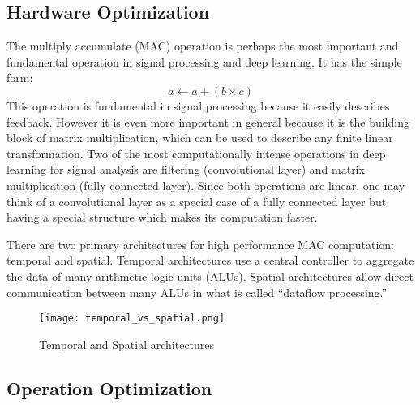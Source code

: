\subsection{Hardware Optimization}
The multiply accumulate (MAC) operation is perhaps the most important and fundamental operation in signal processing and deep learning.  It has the simple form:
$$ a \leftarrow a + (b\times c) $$
This operation is fundamental in signal processing because it easily describes feedback.  However it is even more important in general because it is the building block of matrix multiplication, which can be used to describe any finite linear transformation.  Two of the most computationally intense operations in deep learning for signal analysis are filtering (convolutional layer) and matrix multiplication (fully connected layer).  Since both operations are linear, one may think of a convolutional layer as a special case of a fully connected layer but having a special structure which makes its computation faster.

There are two primary architectures for high performance MAC computation: temporal and spatial. Temporal architectures use a central controller to aggregate the data of many arithmetic logic units (ALUs).  Spatial architectures allow direct communication between many ALUs in what is called ``dataflow processing.'' ~\cite{DBLP:journals/corr/SzeCYE17} 

\begin{figure}[H]
  \centering
  \texttt{[image: temporal\_vs\_spatial.png]}
  \caption{Temporal and Spatial architectures  ~\cite{DBLP:journals/corr/SzeCYE17}}
\end{figure} 

\subsection{Operation Optimization}

